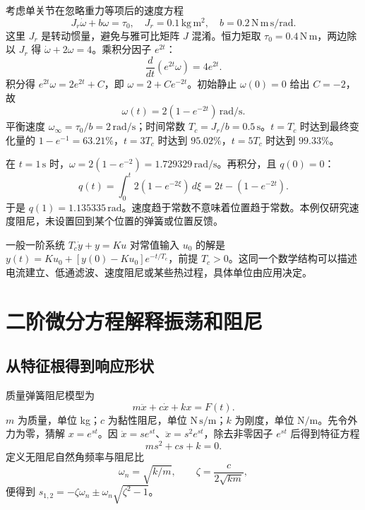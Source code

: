 考虑单关节在忽略重力等项后的速度方程
\begin{equation}
 J_r\dot\omega+b\omega=\tau_0,
 \quad J_r=0.1\,\mathrm{kg\,m^2},\quad
 b=0.2\,\mathrm{N\,m\,s/rad}.
\end{equation}
这里 $J_r$ 是转动惯量，避免与雅可比矩阵 $J$ 混淆。恒力矩取 $\tau_0=0.4\,\mathrm{N\,m}$，两边除以 $J_r$ 得 $\dot\omega+2\omega=4$。乘积分因子 $e^{2t}$：
\begin{equation}
 \frac{d}{dt}(e^{2t}\omega)=4e^{2t}.
\end{equation}
积分得 $e^{2t}\omega=2e^{2t}+C$，即 $\omega=2+Ce^{-2t}$。初始静止 $\omega(0)=0$ 给出 $C=-2$，故
\begin{equation}
 \omega(t)=2(1-e^{-2t})\,\mathrm{rad/s}.
\end{equation}
平衡速度 $\omega_\infty=\tau_0/b=2\,\mathrm{rad/s}$；时间常数 $T_c=J_r/b=0.5\,\mathrm s$。$t=T_c$ 时达到最终变化量的 $1-e^{-1}=63.21\%$，$t=3T_c$ 时达到 $95.02\%$，$t=5T_c$ 时达到 $99.33\%$。
\begin{examplebox}
在 $t=1\,\mathrm s$ 时，$\omega=2(1-e^{-2})=1.729329\,\mathrm{rad/s}$。再积分，且 $q(0)=0$：
\[
 q(t)=\int_0^t2(1-e^{-2\xi})\,d\xi
 =2t-(1-e^{-2t}).
\]
于是 $q(1)=1.135335\,\mathrm{rad}$。速度趋于常数不意味着位置趋于常数。本例仅研究速度阻尼，未设置回到某个位置的弹簧或位置反馈。
\end{examplebox}

一般一阶系统 $T_c\dot y+y=Ku$ 对常值输入 $u_0$ 的解是 $y(t)=Ku_0+[y(0)-Ku_0]e^{-t/T_c}$，前提 $T_c>0$。这同一个数学结构可以描述电流建立、低通滤波、速度阻尼或某些热过程，具体单位由应用决定。

\section{二阶微分方程解释振荡和阻尼}
\subsection{从特征根得到响应形状}
质量弹簧阻尼模型为
\begin{equation}
 m\ddot x+c\dot x+kx=F(t).
\end{equation}
$m$ 为质量，单位 kg；$c$ 为黏性阻尼，单位 $\mathrm{N\,s/m}$；$k$ 为刚度，单位 $\mathrm{N/m}$。先令外力为零，猜解 $x=e^{st}$。因 $\dot x=se^{st}$、$\ddot x=s^2e^{st}$，除去非零因子 $e^{st}$ 后得到特征方程
\begin{equation}
 ms^2+cs+k=0.
\end{equation}
定义无阻尼自然角频率与阻尼比
\begin{equation}
 \omega_n=\sqrt{k/m},\qquad
 \zeta=\frac{c}{2\sqrt{km}},
\end{equation}
便得到 $s_{1,2}=-\zeta\omega_n\pm\omega_n\sqrt{\zeta^2-1}$。

